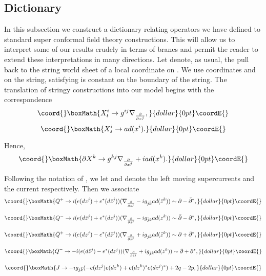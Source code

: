 \documentclass[a4paper,11pt]{amsart}
\providecommand{\db}{\bar{\partial}}
\begin{document}
\subsection{Dictionary}\label{dict}
In this subsection we construct a dictionary relating operators we have defined 
to standard super conformal field theory constructions. This will allow 
us to interpret some of our results crudely in terms of \coordHE{} branes and permit
the reader to extend these interpretations in many directions.  
Let \coordHE{} denote, as usual, the pull back to the string world sheet of a
 local coordinate on \coordHE{}. We use coordinates \coordHE{} and \coordHE{} on the string,
 satisfying \coordHE{} is constant on the boundary of the string. The translation of 
 stringy constructions into our model begins with the correspondence 
$$\coord{}\boxMath{X^i_t\rightarrow g^{ij}\nabla_{\frac{\partial}{\partial x^j}},}{dollar}{0pt}\coordE{}$$  $$\coord{}\boxMath{X^i_s\rightarrow ad(x^i).}{dollar}{0pt}\coordE{}$$ 
 
Hence, 
$$\coord{}\boxMath{\partial X^k \rightarrow g^{kj}\nabla_{\frac{\partial}{\partial x^j}} +
iad(x^k).}{dollar}{0pt}\coordE{}$$
 
Following the notation of \cite{KO}, we let \coordHE{} and \coordHE{} denote the left
 moving supercurrents and the \coordHE{} current respectively. 
Then we associate 
$$\coord{}\boxMath{Q^{+}\rightarrow
 i(e(dz^j) + e^*(d\bar z^j))(\nabla_{\frac{\partial}{\partial z^j}} 
  - ig_{j\bar k}ad(\bar z^k))\sim \partial - \db^*,}{dollar}{0pt}\coordE{}$$
 
$$\coord{}\boxMath{Q^{-}\rightarrow 
i(e(d\bar z^j) + e^*(dz^j))(\nabla_{\frac{\partial}{\partial\bar z^j}}
 - ig_{\bar{j} k}ad(z^k)) \sim \db - \partial^*,}{dollar}{0pt}\coordE{}$$
 
$$\coord{}\boxMath{\bar Q^{+}\rightarrow
 i(e(dz^j) - e^*(d\bar z^j))(\nabla_{\frac{\partial}{\partial z^j}}
 + ig_{j\bar k}ad(\bar z^k)) \sim \partial+\db^*,}{dollar}{0pt}\coordE{}$$
 
$$\coord{}\boxMath{\bar Q^{-}\rightarrow 
-i(e(d\bar z^j) - e^*(dz^j))(\nabla_{\frac{\partial}{\partial \bar z^j}}
 + ig_{\bar{j}k}ad(z^k)) \sim \db+\partial^*,}{dollar}{0pt}\coordE{}$$ 
 
$$\coord{}\boxMath{J\rightarrow -ig_{j\bar k}(-e(dz^j)e(d\bar z^k) + e(dz^k)^*e(d\bar z^j)^*) 
+ 2q-2p,}{dollar}{0pt}\coordE{}$$
\end{document}
